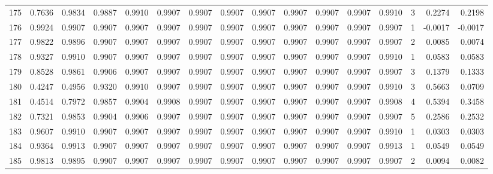\begin{tabular}{lrrrrrrrrrrrrrrr}
175 &      0.7636 &  0.9834 &  0.9887 &  0.9910 &  0.9907 &  0.9907 &  0.9907 &  0.9907 &  0.9907 &  0.9907 &   0.9907 &     0.9910 &      3 &                    0.2274 &                     0.2198 \\
176 &      0.9924 &  0.9907 &  0.9907 &  0.9907 &  0.9907 &  0.9907 &  0.9907 &  0.9907 &  0.9907 &  0.9907 &   0.9907 &     0.9907 &      1 &                   -0.0017 &                    -0.0017 \\
177 &      0.9822 &  0.9896 &  0.9907 &  0.9907 &  0.9907 &  0.9907 &  0.9907 &  0.9907 &  0.9907 &  0.9907 &   0.9907 &     0.9907 &      2 &                    0.0085 &                     0.0074 \\
178 &      0.9327 &  0.9910 &  0.9907 &  0.9907 &  0.9907 &  0.9907 &  0.9907 &  0.9907 &  0.9907 &  0.9907 &   0.9907 &     0.9910 &      1 &                    0.0583 &                     0.0583 \\
179 &      0.8528 &  0.9861 &  0.9906 &  0.9907 &  0.9907 &  0.9907 &  0.9907 &  0.9907 &  0.9907 &  0.9907 &   0.9907 &     0.9907 &      3 &                    0.1379 &                     0.1333 \\
180 &      0.4247 &  0.4956 &  0.9320 &  0.9910 &  0.9907 &  0.9907 &  0.9907 &  0.9907 &  0.9907 &  0.9907 &   0.9907 &     0.9910 &      3 &                    0.5663 &                     0.0709 \\
181 &      0.4514 &  0.7972 &  0.9857 &  0.9904 &  0.9908 &  0.9907 &  0.9907 &  0.9907 &  0.9907 &  0.9907 &   0.9907 &     0.9908 &      4 &                    0.5394 &                     0.3458 \\
182 &      0.7321 &  0.9853 &  0.9904 &  0.9906 &  0.9907 &  0.9907 &  0.9907 &  0.9907 &  0.9907 &  0.9907 &   0.9907 &     0.9907 &      5 &                    0.2586 &                     0.2532 \\
183 &      0.9607 &  0.9910 &  0.9907 &  0.9907 &  0.9907 &  0.9907 &  0.9907 &  0.9907 &  0.9907 &  0.9907 &   0.9907 &     0.9910 &      1 &                    0.0303 &                     0.0303 \\
184 &      0.9364 &  0.9913 &  0.9907 &  0.9907 &  0.9907 &  0.9907 &  0.9907 &  0.9907 &  0.9907 &  0.9907 &   0.9907 &     0.9913 &      1 &                    0.0549 &                     0.0549 \\
185 &      0.9813 &  0.9895 &  0.9907 &  0.9907 &  0.9907 &  0.9907 &  0.9907 &  0.9907 &  0.9907 &  0.9907 &   0.9907 &     0.9907 &      2 &                    0.0094 &                     0.0082 \\

\end{tabular}
